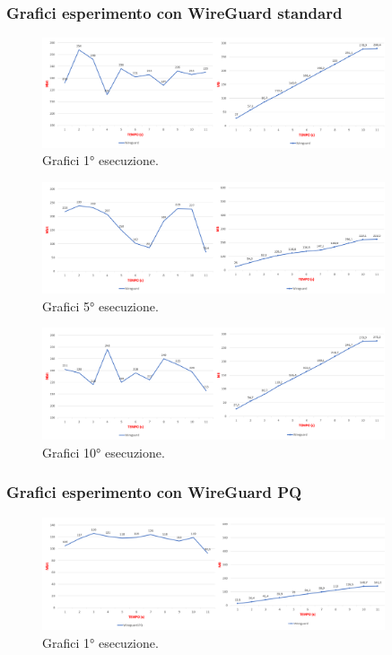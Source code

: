 \newpage
\subsubsection{Grafici esperimento con WireGuard standard}

\begin{figure}[h] \includegraphics[width=0.9\textwidth] {Tesi magistrale/capitoli/images/56.png}
\centering
\caption{Grafici 1° esecuzione.}
\end{figure}

\begin{figure}[h] \includegraphics[width=0.9\textwidth] {Tesi magistrale/capitoli/images/57.png}
\centering
\caption{Grafici 5° esecuzione.}
\end{figure}

\begin{figure}[h] \includegraphics[width=0.9\textwidth] {Tesi magistrale/capitoli/images/58.png}
\centering
\caption{Grafici 10° esecuzione.}
\end{figure}

\newpage
\subsubsection{Grafici esperimento con WireGuard PQ}

\begin{figure}[h] \includegraphics[width=0.9\textwidth] {Tesi magistrale/capitoli/images/59.png}
\centering
\caption{Grafici 1° esecuzione.}
\end{figure}

